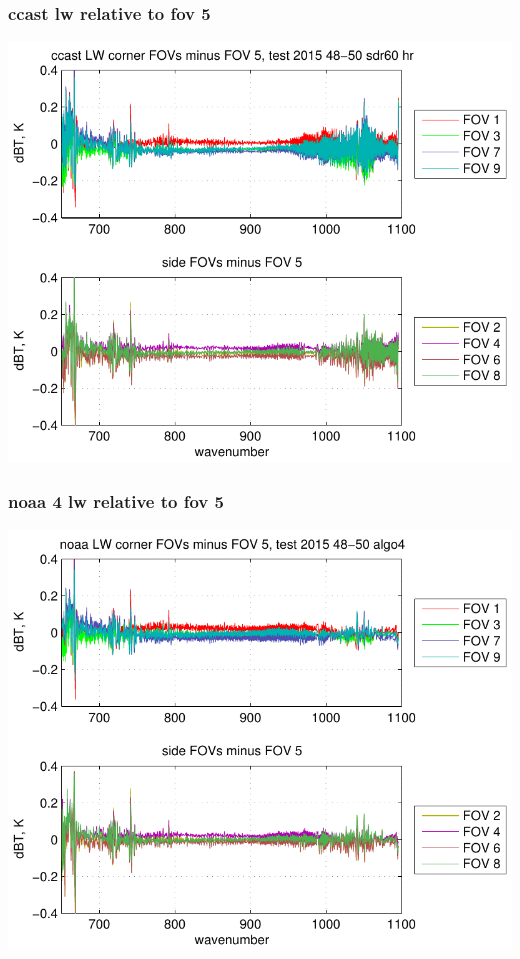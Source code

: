 \documentclass[11pt]{beamer}
\begin{document}
\begin{frame}
\frametitle{ccast lw relative to fov 5}
\begin{center}
  \includegraphics[scale=0.7]{figures/ccast_LW_dif_2015_48-50_sdr60_hr.pdf}
\end{center}
\end{frame}
\begin{frame}
\frametitle{noaa 4 lw relative to fov 5}
\begin{center}
  \includegraphics[scale=0.7]{figures/noaa_LW_dif_2015_48-50_algo4.pdf}
\end{center}
\end{frame}
\end{document}

